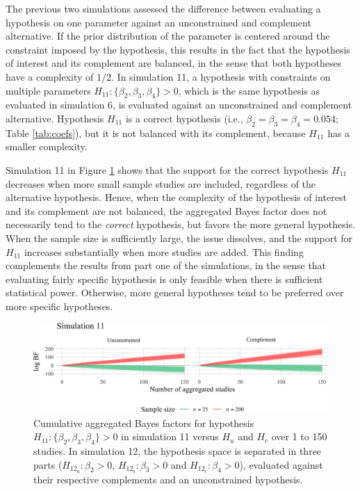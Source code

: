 \documentclass[review, 3p, authoryear]{elsarticle} %
\begin{document}
The previous two simulations assessed the difference between evaluating a hypothesis on one parameter against an unconstrained and complement alternative.
If the prior distribution of the parameter is centered around the constraint imposed by the hypothesis, this results in the fact that the hypothesis of interest and its complement are balanced, in the sense that both hypotheses have a complexity of \(1/2\).
In simulation 11, a hypothesis with constraints on multiple parameters \(H_{11}: \{\beta_2, \beta_3, \beta_4\} > 0\), which is the same hypothesis as evaluated in simulation 6, is evaluated against an unconstrained and complement alternative.
Hypothesis \(H_{11}\) is a correct hypothesis (i.e., \(\beta_2 = \beta_3 = \beta_4 = 0.054\); Table \ref{tab:coefs}), but it is not balanced with its complement, because \(H_{11}\) has a smaller complexity.

Simulation 11 in Figure \ref{fig:simBF11} shows that the support for the correct hypothesis \(H_{11}\) decreases when more small sample studies are included, regardless of the alternative hypothesis.
Hence, when the complexity of the hypothesis of interest and its complement are not balanced, the aggregated Bayes factor does not necessarily tend to the \emph{correct} hypothesis, but favors the more general hypothesis.
When the sample size is sufficiently large, the issue dissolves, and the support for \(H_{11}\) increases substantially when more studies are added.
This finding complements the results from part one of the simulations, in the sense that evaluating fairly specific hypothesis is only feasible when there is sufficient statistical power.
Otherwise, more general hypotheses tend to be preferred over more specific hypotheses.

\begin{figure}[!t]
\includegraphics[width=1\linewidth]{manuscript_volker_files/figure-latex/simBF11-1} \caption{Cumulative aggregated Bayes factors for hypothesis $H_{11}: \{\beta_2, \beta_3, \beta_4\} > 0$ in simulation 11 versus $H_u$ and $H_c$ over 1 to 150 studies. In simulation 12, the hypothesis space is separated in three parts ($H_{12_a}: \beta_2 > 0$, $H_{12_b}: \beta_3 > 0$ and  $H_{12_c}: \beta_4 > 0$), evaluated against their respective complements and an unconstrained hypothesis.}\label{fig:simBF11}
\end{figure}
\end{document}
